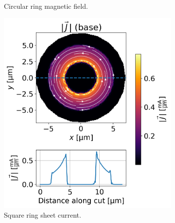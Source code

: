 \documentclass[preprint,12pt]{elsarticle}
\begin{document}
\begin{figure}
\begin{subfigure}{.4\textwidth}
  \caption{Circular ring magnetic field.}
  \label{fig:circular_ring_plot_fields}
\end{subfigure}

\begin{subfigure}{.4\textwidth}
  \centering
  \includegraphics[width=\linewidth]{examples/images/ring/circular_ring_circ_plot_currents.png}
  \caption{Square ring sheet current.}
  \label{fig:square_ring_plot_currents}
\end{subfigure}
\begin{subfigure}{.4\textwidth}
  \centering

\end{subfigure}
\end{figure}
\end{document}
